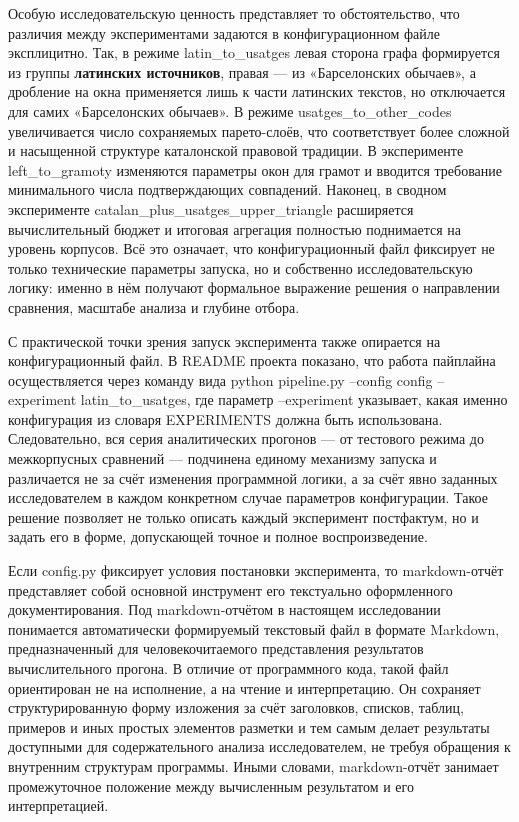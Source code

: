 Особую исследовательскую ценность представляет то обстоятельство, что различия между экспериментами задаются в конфигурационном файле эксплицитно. Так, в режиме latin\_to\_usatges левая сторона графа формируется из группы \textbf{латинских источников}, правая --- из «Барселонских обычаев», а дробление на окна применяется лишь к части латинских текстов, но отключается для самих «Барселонских обычаев». В режиме usatges\_to\_other\_codes увеличивается число сохраняемых парето-слоёв, что соответствует более сложной и насыщенной структуре каталонской правовой традиции. В эксперименте left\_to\_gramoty изменяются параметры окон для грамот и вводится требование минимального числа подтверждающих совпадений. Наконец, в сводном эксперименте catalan\_plus\_usatges\_upper\_triangle расширяется вычислительный бюджет и итоговая агрегация полностью поднимается на уровень корпусов. Всё это означает, что конфигурационный файл фиксирует не только технические параметры запуска, но и собственно исследовательскую логику: именно в нём получают формальное выражение решения о направлении сравнения, масштабе анализа и глубине отбора.

С практической точки зрения запуск эксперимента также опирается на конфигурационный файл. В README проекта показано, что работа пайплайна осуществляется через команду вида python pipeline.py --config config --experiment latin\_to\_usatges, где параметр --experiment указывает, какая именно конфигурация из словаря EXPERIMENTS должна быть использована. Следовательно, вся серия аналитических прогонов --- от тестового режима до межкорпусных сравнений --- подчинена единому механизму запуска и различается не за счёт изменения программной логики, а за счёт явно заданных исследователем в каждом конкретном случае параметров конфигурации. Такое решение позволяет не только описать каждый эксперимент постфактум, но и задать его в форме, допускающей точное и полное воспроизведение.

Если config.py фиксирует условия постановки эксперимента, то markdown-отчёт представляет собой основной инструмент его текстуально оформленного документирования. Под markdown-отчётом в настоящем исследовании понимается автоматически формируемый текстовый файл в формате Markdown, предназначенный для человекочитаемого представления результатов вычислительного прогона. В отличие от программного кода, такой файл ориентирован не на исполнение, а на чтение и интерпретацию. Он сохраняет структурированную форму изложения за счёт заголовков, списков, таблиц, примеров и иных простых элементов разметки и тем самым делает результаты доступными для содержательного анализа исследователем, не требуя обращения к внутренним структурам программы. Иными словами, markdown-отчёт занимает промежуточное положение между вычисленным результатом и его интерпретацией.

